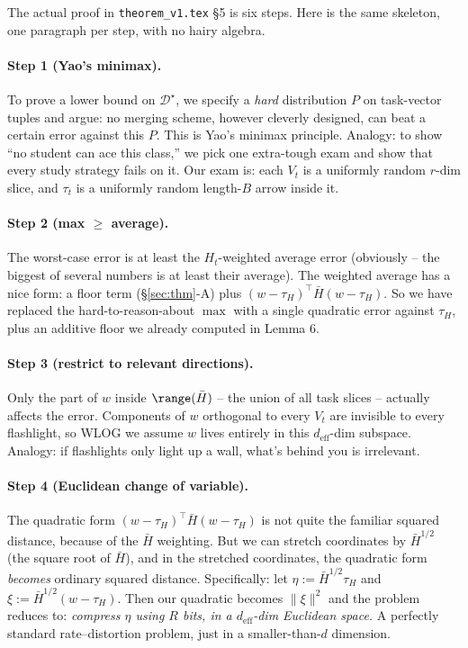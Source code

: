 \documentclass[11pt]{article}
\newcommand{\tauH}{\tau_{\!H}}
\newcommand{\deff}{d_{\mathrm{eff}}}
\newcommand{\Hbar}{\bar H}
\begin{document}
The actual proof in \texttt{theorem\_v1.tex} \S5 is six steps. Here is
the same skeleton, one paragraph per step, with no hairy algebra.

\paragraph{Step 1 (Yao's minimax).} To prove a lower bound on
$\mathcal{D}^\star$, we specify a \emph{hard} distribution $P$ on
task-vector tuples and argue: no merging scheme, however cleverly
designed, can beat a certain error against this $P$. This is Yao's
minimax principle. Analogy: to show ``no student can ace this class,''
we pick one extra-tough exam and show that every study strategy fails
on it. Our exam is: each $V_t$ is a uniformly random $r$-dim slice,
and $\tau_t$ is a uniformly random length-$B$ arrow inside it.

\paragraph{Step 2 (max $\geq$ average).} The worst-case error is at
least the $H_t$-weighted average error (obviously -- the biggest of
several numbers is at least their average). The weighted average has
a nice form: a floor term (\S\ref{sec:thm}-A) plus $(w - \tauH)^\top
\Hbar (w - \tauH)$. So we have replaced the hard-to-reason-about
$\max$ with a single quadratic error against $\tauH$, plus an additive
floor we already computed in Lemma 6.

\paragraph{Step 3 (restrict to relevant directions).} Only the part of
$w$ inside $\range(\Hbar)$ -- the union of all task slices -- actually
affects the error. Components of $w$ orthogonal to every $V_t$ are
invisible to every flashlight, so WLOG we assume $w$ lives entirely in
this $\deff$-dim subspace. Analogy: if flashlights only light up a
wall, what's behind you is irrelevant.

\paragraph{Step 4 (Euclidean change of variable).} The quadratic form
$(w-\tauH)^\top\Hbar(w-\tauH)$ is not quite the familiar squared
distance, because of the $\Hbar$ weighting. But we can stretch
coordinates by $\Hbar^{1/2}$ (the square root of $\Hbar$), and in the
stretched coordinates, the quadratic form \emph{becomes} ordinary
squared distance. Specifically: let $\eta := \Hbar^{1/2}\tauH$ and
$\xi := \Hbar^{1/2}(w-\tauH)$. Then our quadratic becomes $\|\xi\|^2$
and the problem reduces to: \emph{compress $\eta$ using $R$ bits, in a
$\deff$-dim Euclidean space.} A perfectly standard
rate--distortion problem, just in a smaller-than-$d$ dimension.
\end{document}
